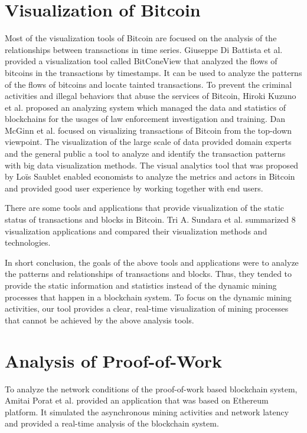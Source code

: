 \section{Visualization of Bitcoin}

Most of the visualization tools of Bitcoin are focused on the analysis of the relationships between transactions in time series. Giuseppe Di Battista et al. \cite{Battista2015} provided a visualization tool called BitConeView that analyzed the flows of bitcoins in the transactions by timestamps. It can be used to analyze the patterns of the flows of bitcoins and locate tainted transactions. To prevent the criminal activities and illegal behaviors that abuse the services of Bitcoin, Hiroki Kuzuno et al. \cite{Kuzuno2017} proposed an analyzing system which managed the data and statistics of blockchains for the usages of law enforcement investigation and training. Dan McGinn et al. \cite{McGinn2016} focused on visualizing transactions of Bitcoin from the top-down viewpoint. The visualization of the large scale of data provided domain experts and the general public a tool to analyze and identify the transaction patterns with big data visualization methods. The visual analytics tool that was proposed by Loïs Saublet \cite{Saublet2015} enabled economists to analyze the metrics and actors in Bitcoin and provided good user experience by working together with end users.

There are some tools and applications that provide visualization of the static status of transactions and blocks in Bitcoin. Tri A. Sundara et al. \cite{Sundara2017} summarized 8 visualization applications and compared their visualization methods and technologies.

In short conclusion, the goals of the above tools and applications were to analyze the patterns and relationships of transactions and blocks. Thus, they tended to provide the static information and statistics instead of the dynamic mining processes that happen in a blockchain system. To focus on the dynamic mining activities, our tool provides a clear, real-time visualization of mining processes that cannot be achieved by the above analysis tools.

\section{Analysis of Proof-of-Work}

To analyze the network conditions of the proof-of-work based blockchain system, Amitai Porat et al. \cite{Porat} provided an application that was based on Ethereum platform. It simulated the asynchronous mining activities and network latency and provided a real-time analysis of the blockchain system.

